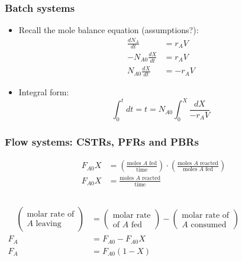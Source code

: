 \begin{frame}\frametitle{Batch systems}
	\begin{itemize}
		\item	Recall the mole balance equation (assumptions?):
		\begin{align*}
			\frac{dN_A}{dt} &= r_AV\\
			-N_{A0}\frac{dX}{dt} &= r_AV\\
			N_{A0}\frac{dX}{dt} &= -r_AV
		\end{align*}
		\item	Integral form: $$\int_0^tdt = t = N_{A0}\int_0^X\frac{dX}{-r_AV}$$
	\end{itemize}
	{}
\end{frame}

\begin{frame}\frametitle{Flow systems: CSTRs, PFRs and PBRs}
	\begin{align*}
		F_{A0}X &= \left(\frac{\text{moles }A\text{ fed}}{\text{time}}\right)\cdot\left(\frac{\text{moles }A\text{ reacted}}{\text{moles }A\text{ fed}}\right)\\
		F_{A0}X &= \frac{\text{moles }A\text{ reacted}}{\text{time}}
	\end{align*}
	\vspace{-12pt}
	\begin{columns}[t]
			\begin{align*}
				\quad\left(\begin{array}{c}
					\text{molar rate of}\\A\text{ leaving}
				\end{array}\right)
				&=
				\left(\begin{array}{c}
					\text{molar rate}\\\text{of }A\text{ fed}
				\end{array}\right)
				-
				\left(\begin{array}{c}
					\text{molar rate of}\\A\text{ consumed}
				\end{array}\right)
				\\
				F_A &= F_{A0} - F_{A0}X\\
				F_A &= F_{A0}(1 - X)
			\end{align*}
	\end{columns}
\end{frame}

